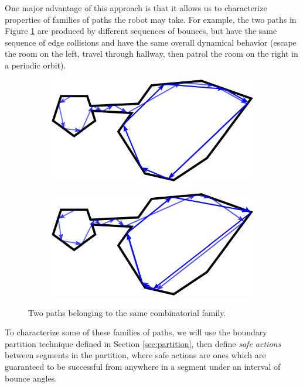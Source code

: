 \documentclass[]{svproc}  %
\begin{document}
One major advantage of this approach is that it allows us to characterize
properties of families of paths the robot may take. For example, the  
two paths in Figure \ref{fig:twopaths} are produced by different sequences of
bounces, but have the same sequence of edge collisions and have the same overall
dynamical behavior (escape the room on the left, travel through hallway, then
patrol the room on the right in a periodic orbit).

\begin{figure}
\centering
\begin{subfigure}{0.5\textwidth}
\includegraphics[width=\linewidth]{figures/twoc_a}
\end{subfigure}%
\begin{subfigure}{0.5\textwidth}
\includegraphics[width=\linewidth]{figures/twoc_b}
\end{subfigure}
\caption{Two paths belonging to the same combinatorial family.}
\label{fig:twopaths}
\end{figure}

To characterize some of these families of paths, we will use the boundary
partition technique defined in Section \ref{sec:partition}, then define
\emph{safe actions} between segments in the partition, where safe actions are
ones which are guaranteed to be successful from anywhere in a segment under an
interval of bounce angles.
\end{document}
